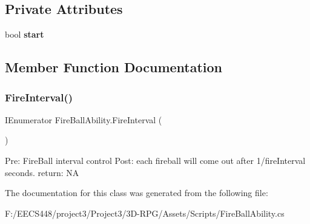 \subsection*{Private Attributes}
\begin{DoxyCompactItemize}
\item 
\mbox{\label{class_fire_ball_ability_a1f3a211edbf403b6abf04e16e1ae7648}} 
bool {\bfseries start}
\end{DoxyCompactItemize}


\subsection{Member Function Documentation}
\mbox{\label{class_fire_ball_ability_af7a5f8e3ea3518a2f8c7845375dd63a2}} 
\subsubsection{\texorpdfstring{Fire\+Interval()}{FireInterval()}}
{\footnotesize\ttfamily I\+Enumerator Fire\+Ball\+Ability.\+Fire\+Interval (\begin{DoxyParamCaption}{ }\end{DoxyParamCaption})\hspace{0.3cm}{\ttfamily [private]}}

Pre\+: Fire\+Ball interval control Post\+: each fireball will come out after 1/fire\+Interval seconds. return\+: NA 

The documentation for this class was generated from the following file\+:\begin{DoxyCompactItemize}
\item 
F\+:/\+E\+E\+C\+S448/project3/\+Project3/3\+D-\/\+R\+P\+G/\+Assets/\+Scripts/Fire\+Ball\+Ability.\+cs\end{DoxyCompactItemize}
